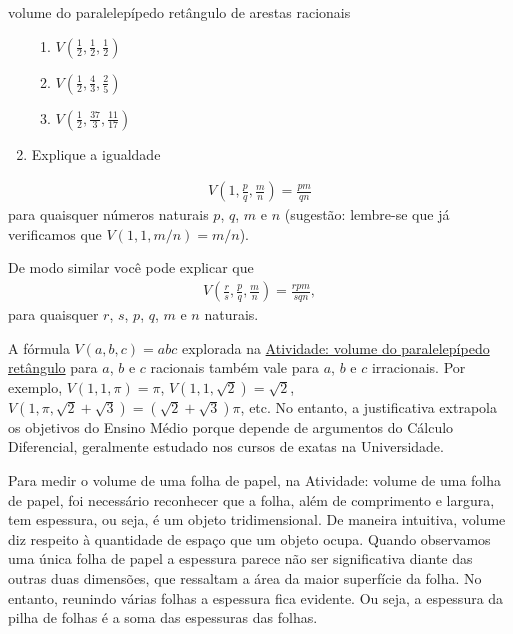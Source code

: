 \begin{task}{volume do paralelepípedo retângulo de arestas racionais}
\begin{enumerate}
\begin{enumerate}
\item {} 
\(V\left(\frac{1}{2},\frac{1}{2},\frac{1}{2}\right)\)

\item {} 
\(V\left(\frac{1}{2},\frac{4}{3},\frac{2}{5}\right)\)

\item {} 
\(V\left(\frac{1}{2},\frac{37}{3},\frac{11}{17}\right)\)

\end{enumerate}

\item {} 
Explique a igualdade

\end{enumerate}
\begin{equation*}
\begin{split}V\left(1, \frac{p}{q}, \frac{m}{n}\right) = \frac{pm}{qn}\end{split}
\end{equation*}
para quaisquer números naturais \(p\), \(q\), \(m\) e \(n\) (sugestão: lembre-se que já verificamos que \(V(1, 1, m/n) = m/n\)).

De modo similar você pode explicar que
\begin{equation*}
\begin{split}\displaystyle{V\left(\frac{r}{s}, \frac{p}{q}, \frac{m}{n}\right) = \frac{rpm}{sqn}},\end{split}
\end{equation*}
para quaisquer \(r\), \(s\), \(p\), \(q\), \(m\) e \(n\) naturais.
\end{task}

\begin{observation}

A fórmula \(V(a,b,c) = abc\) explorada na \hyperref[persp1-atividade-3]{Atividade: volume do paralelepípedo retângulo} para \(a\), \(b\) e \(c\) racionais também vale para \(a\), \(b\) e \(c\) irracionais. Por exemplo, \(V(1,1,\pi) = \pi\), \(V(1,1,\sqrt{2}) = \sqrt{2}\), \(V(1,\pi,\sqrt{2} + \sqrt{3}) = (\sqrt{2} + \sqrt{3})\pi\), etc. No entanto, a justificativa extrapola os objetivos do Ensino Médio porque depende de argumentos do Cálculo Diferencial, geralmente estudado nos cursos de exatas na Universidade.
\end{observation}


\label{\detokenize{GE504-1:organizando-as-ideias-o-conceito-de-volume}}\label{\detokenize{GE504-1::doc}}
Para medir o volume de uma folha de papel, na Atividade: volume de uma folha de papel, foi necessário reconhecer que a folha, além de comprimento e largura, tem espessura, ou seja, é um objeto tridimensional.  De maneira intuitiva, volume diz respeito à quantidade de espaço que um objeto ocupa. Quando observamos uma única folha de papel a espessura parece não ser significativa diante das outras duas dimensões, que ressaltam a área da maior superfície da folha. No entanto, reunindo várias folhas a espessura fica evidente. Ou seja, a espessura da pilha de folhas é a soma das espessuras das folhas.

